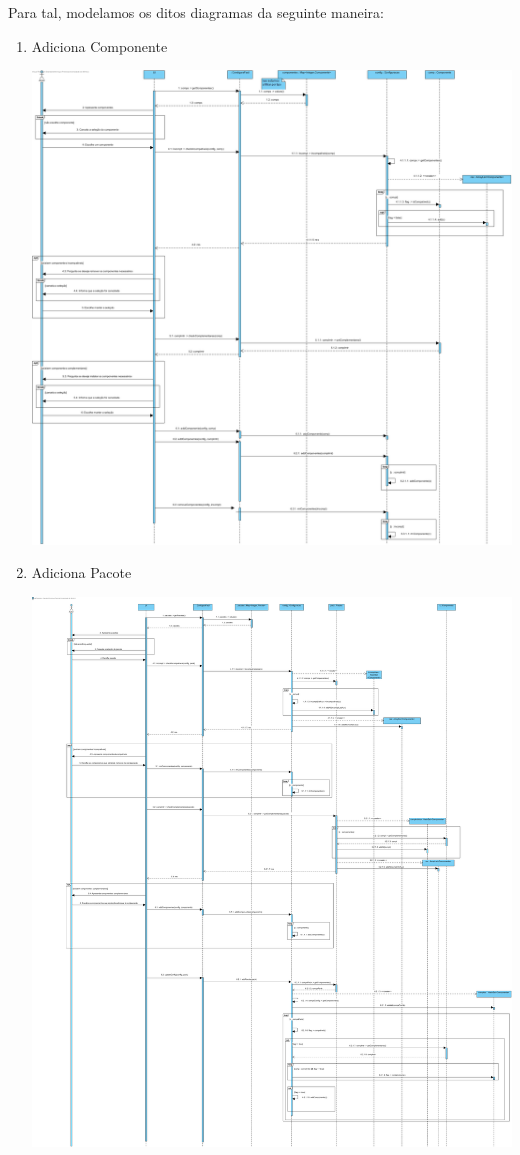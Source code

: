 \documentclass[11pt]{article} %
\begin{document}
Para tal, modelamos os ditos diagramas da seguinte maneira:
\begin{enumerate}
	\item Adiciona Componente
		\begin{center}
 			\includegraphics[width = 6in]{dsi_adicionar_componente.png}
		\end{center}
	\item Adiciona Pacote
		\begin{center}
 			\includegraphics[width = 6in]{dsi_adicionar_pacote.png}

\end{center}
\end{enumerate}
\end{document}
